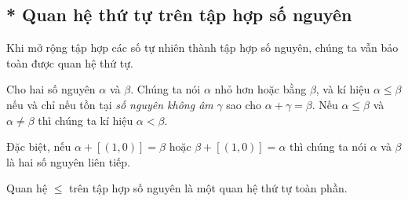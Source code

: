 \subsection{* Quan hệ thứ tự trên tập hợp số nguyên}

Khi mở rộng tập hợp các số tự nhiên thành tập hợp số nguyên, chúng ta vẫn bảo toàn được quan hệ thứ tự.

\begin{definition}
    Cho hai số nguyên $\alpha$ và $\beta$. Chúng ta nói $\alpha$ nhỏ hơn hoặc bằng $\beta$, và kí hiệu $\alpha\leq \beta$ nếu và chỉ nếu tồn tại \textit{số nguyên không âm} $\gamma$ sao cho $\alpha + \gamma = \beta$. Nếu $\alpha\leq \beta$ và $\alpha\ne \beta$ thì chúng ta kí hiệu $\alpha < \beta$.

    Đặc biệt, nếu $\alpha + [(1, 0)] = \beta$ hoặc $\beta + [(1, 0)] = \alpha$ thì chúng ta nói $\alpha$ và $\beta$ là hai số nguyên liên tiếp.
\end{definition}

\begin{theorem}
    Quan hệ $\leq$ trên tập hợp số nguyên là một quan hệ thứ tự toàn phần.
\end{theorem}

